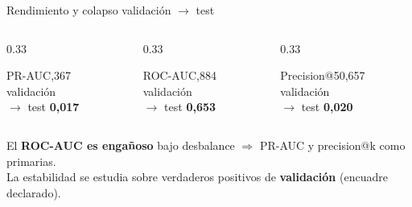 \documentclass[aspectratio=169,10pt]{beamer}
\begin{document}
\begin{frame}{Rendimiento y colapso validación $\rightarrow$ test}
\begin{columns}[T]
\begin{column}{0.33\textwidth}
\begin{block}{PR-AUC},367 \\ {\footnotesize\color{muted}validación}\\ $\rightarrow$ test \textbf{\color{coral}0,017}\end{block}
\end{column}
\begin{column}{0.33\textwidth}
\begin{block}{ROC-AUC},884 \\ {\footnotesize\color{muted}validación}\\ $\rightarrow$ test \textbf{\color{coral}0,653}\end{block}
\end{column}
\begin{column}{0.33\textwidth}
\begin{block}{Precision@50},657 \\ {\footnotesize\color{muted}validación}\\ $\rightarrow$ test \textbf{\color{coral}0,020}\end{block}
\end{column}
\end{columns}
\vspace{6pt}
\begin{center}\small
El \textbf{ROC-AUC es engañoso} bajo desbalance $\Rightarrow$ PR-AUC y precision@k como primarias.\\
La estabilidad se estudia sobre verdaderos positivos de \textbf{validación} (encuadre declarado).
\end{center}
\end{frame}
\end{document}
